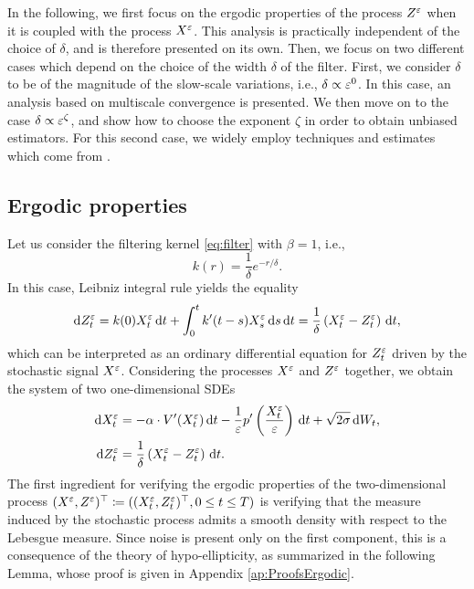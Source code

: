 \documentclass[review,onefignum,onetabnum]{siamonline190516}
\begin{document}
{In the following, we first focus on the ergodic properties of the process $Z^\varepsilon$ when it is coupled with the process $X^\varepsilon$. This analysis is practically independent of the choice of $\delta$, and is therefore presented on its own. Then, we focus on two different cases which depend on the choice of the width $\delta$ of the filter. First, we consider $\delta$ to be of the magnitude of the slow-scale variations, i.e., $\delta \propto \varepsilon^0$. In this case, an analysis based on multiscale convergence is presented. We then move on to the case $\delta \propto \varepsilon^\zeta$, and show how to choose the exponent $\zeta$ in order to obtain unbiased estimators. For this second case, we widely employ techniques and estimates which come from \cite{PaS07}.
}


\subsection{Ergodic properties}\label{sec:ergodic}

Let us consider the filtering kernel \eqref{eq:filter} with $\beta = 1$, i.e.,
\begin{equation}\label{eq:filter_beta1}
	k(r) = \frac{1}{\delta} e^{-r/\delta}.
\end{equation}
In this case, Leibniz integral rule yields the equality
\begin{equation}
	\mathrm{d} Z^\varepsilon_t = k(0) X^\varepsilon_t \,\mathrm{d} t + \int_0^t k'(t-s) X^\varepsilon_s \,\mathrm{d} s \,\mathrm{d} t = \frac{1}{\delta} \left ( X^\varepsilon_t - Z^\varepsilon_t \right ) \,\mathrm{d} t,
\end{equation}
which can be interpreted as an ordinary differential equation for $Z_t^\varepsilon$ driven by the stochastic signal $X^\varepsilon$. Considering the processes $X^\varepsilon$ and $Z^\varepsilon$ together, we obtain the system of two one-dimensional SDEs
\begin{equation}
\label{eq:systemSDE}
\begin{aligned}
\d X_t^\epl &= -\alpha \cdot V'(X_t^\epl) \dd t - \frac1\epl p'\left(\frac{X_t^\epl}\epl\right) \dd t+ \sqrt{2\sigma} \dd W_t, \\
\d Z^\epl_t &= \frac{1}{\delta} \left ( X^\epl_t - Z^\epl_t \right ) \dd t.
\end{aligned}
\end{equation}
The first ingredient for verifying the ergodic properties of the two-dimensional process $(X^\varepsilon, Z^\varepsilon)^\top \coloneqq ((X^\varepsilon_t, Z^\varepsilon_t)^\top, 0 \leq t \leq T)$ is verifying that the measure induced by the stochastic process admits a smooth density with respect to the Lebesgue measure. Since noise is present only on the first component, this is a consequence of the theory of hypo-ellipticity, as summarized in the following Lemma, whose proof is given in Appendix \ref{ap:ProofsErgodic}.
\end{document}
